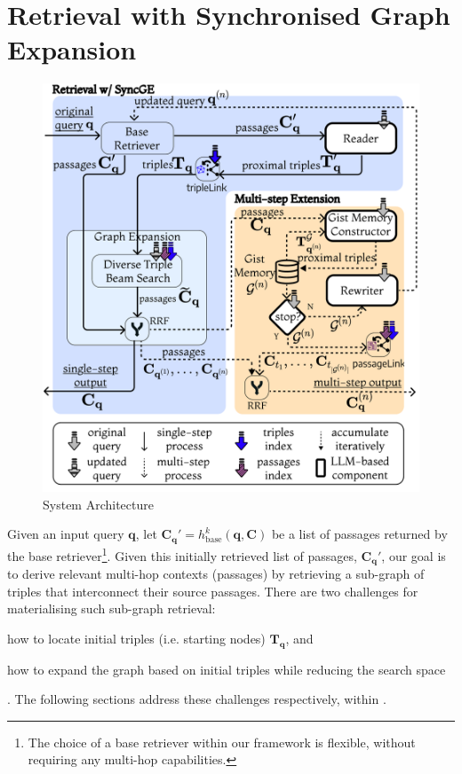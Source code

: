 \section{Retrieval with Synchronised Graph Expansion}
\label{sec:graph_retrieval}

\def\Tqinit{\mathbf{T}_\mathbf{q}}


\begin{figure}[thbp]
  \includegraphics[width=\columnwidth]{figures/gear-sys-fig.pdf}
  \caption{\label{fig:system_diagram}System Architecture}
\end{figure}



Given an input query $\mathbf{q}$, let $\mathbf{C}_\mathbf{q}' = h^k_{\text{base}}\left( \mathbf{q}, {\mathbf{C}}\right )$  be a list of passages returned by the base retriever\footnote{The choice of a base retriever within our framework is flexible, without requiring any multi-hop capabilities.}.
Given this initially retrieved list of passages, $\mathbf{C}_\mathbf{q}'$, our goal is to derive relevant multi-hop contexts (passages) by retrieving a sub-graph of triples that interconnect their source passages. There are two challenges for materialising such sub-graph retrieval: \begin{inparaenum}[(i)]\item how to locate initial triples (i.e. starting nodes) $\Tqinit$, and \item how to expand the graph based on initial triples while reducing the search space\end{inparaenum}. The following sections address these challenges respectively, within \gear.



